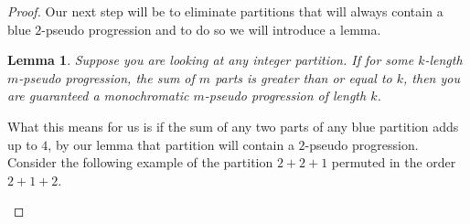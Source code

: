\documentclass[ fontsize=10pt,twoside]{scrartcl}	%
\newcommand*\circled[1]{\tikz[baseline=(char.base)]{
            \node[shape=circle,draw,inner sep=2pt] (char) {#1};}}
\newtheorem{lemma}{Lemma}
\begin{document}
\begin{proof}
Our next step will be to eliminate partitions that will always contain a blue $2$-pseudo progression and to do so we will introduce a lemma.
\begin{lemma}
Suppose you are looking at any integer partition. If for some $k$-length $m$-pseudo progression, the sum of $m$ parts is greater than or equal to $k$, then you are guaranteed a monochromatic $m$-pseudo progression of length $k$.
\end{lemma}
\noindent What this means for us is if the sum of any two parts of any blue partition adds up to $4$, by our lemma that partition will contain a $2$-pseudo progression. Consider the following example of the partition $2+2+1$ permuted in the order $2+1+2$.
\begin{center}
\end{center}
\end{proof}
\end{document}
